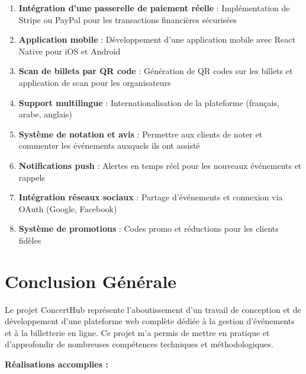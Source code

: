 \documentclass[a4paper,12pt,twoside]{report}
\begin{document}
\begin{enumerate}
    \item \textbf{Intégration d'une passerelle de paiement réelle} : Implémentation de Stripe ou PayPal pour les transactions financières sécurisées
    
    \item \textbf{Application mobile} : Développement d'une application mobile avec React Native pour iOS et Android
    
    \item \textbf{Scan de billets par QR code} : Génération de QR codes sur les billets et application de scan pour les organisateurs
    
    \item \textbf{Support multilingue} : Internationalisation de la plateforme (français, arabe, anglais)
    
    \item \textbf{Système de notation et avis} : Permettre aux clients de noter et commenter les événements auxquels ils ont assisté
    
    \item \textbf{Notifications push} : Alertes en temps réel pour les nouveaux événements et rappels
    
    \item \textbf{Intégration réseaux sociaux} : Partage d'événements et connexion via OAuth (Google, Facebook)
    
    \item \textbf{Système de promotions} : Codes promo et réductions pour les clients fidèles
\end{enumerate}

\chapter*{Conclusion Générale}
\thispagestyle{plain}

Le projet ConcertHub représente l'aboutissement d'un travail de conception et de développement d'une plateforme web complète dédiée à la gestion d'événements et à la billetterie en ligne. Ce projet m'a permis de mettre en pratique et d'approfondir de nombreuses compétences techniques et méthodologiques.

\textbf{Réalisations accomplies :}
\end{document}
